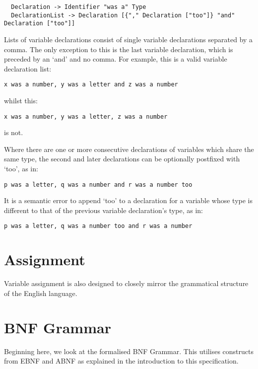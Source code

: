 \documentclass[a4wide, 11pt]{article}
\begin{document}
\begin{verbatim}
  Declaration -> Identifier "was a" Type
  DeclarationList -> Declaration [{"," Declaration ["too"]} "and" Declaration ["too"]]
\end{verbatim}

Lists of variable declarations consist of single variable declarations separated by a comma. The only exception to this is the last variable declaration, which is preceded by an `and' and no comma. For example, this is a valid variable declaration list:

\begin{verbatim}
x was a number, y was a letter and z was a number
\end{verbatim}

whilst this:

\begin{verbatim}
x was a number, y was a letter, z was a number
\end{verbatim}

is not.

Where there are one or more consecutive declarations of variables which share the same type, the second and later declarations can be optionally postfixed with `too', as in:

\begin{verbatim}
p was a letter, q was a number and r was a number too
\end{verbatim}

It is a semantic error to append `too' to a declaration for a variable whose type is different to that of the previous variable declaration's type, as in:

\begin{verbatim}
p was a letter, q was a number too and r was a number
\end{verbatim}

\section{Assignment}

Variable assignment is also designed to closely mirror the grammatical structure of the English language.

\section{BNF Grammar} 

Beginning here, we look at the formalised BNF Grammar. This utilises constructs from EBNF and ABNF as explained in the introduction to this specification.
\end{document}
